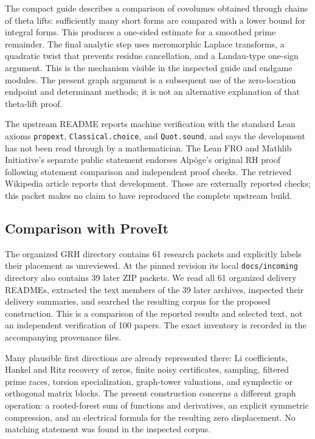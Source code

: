 The compact guide describes a comparison of covolumes obtained through
chains of theta lifts: sufficiently many short forms are compared with a
lower bound for integral forms.  This produces a one-sided estimate for a
smoothed prime remainder.  The final analytic step uses meromorphic
Laplace transforms, a quadratic twist that prevents residue cancellation,
and a Landau-type one-sign argument.  This is the mechanism visible in
the inspected guide and endgame modules.  The present graph argument is a
subsequent use of the zero-location endpoint and determinant methods; it
is not an alternative explanation of that theta-lift proof.\cite{grhguide}

The upstream README reports machine verification with the standard Lean
axioms \texttt{propext}, \texttt{Classical.choice}, and \texttt{Quot.sound},
and says the development has not been read through by a mathematician.
The Lean FRO and Mathlib Initiative's separate public statement endorses
Alp\"oge's original RH proof following statement comparison and independent
proof checks.  The retrieved Wikipedia article reports that development.
Those are externally reported checks; this packet makes no claim to have
reproduced the complete upstream build.\cite{grhsource,leanstatement,wikipedia}

\subsection{Comparison with ProveIt}

The organized GRH directory contains 61 research packets and explicitly
labels their placement as unreviewed.  At the pinned revision its local
\texttt{docs/incoming} directory also contains 39 later ZIP packets.  We
read all 61 organized delivery READMEs, extracted the text members of the
39 later archives, inspected their delivery summaries, and searched the
resulting corpus for the proposed construction.  This is a comparison of
the reported results and selected text, not an independent verification of
100 papers.  The exact inventory is recorded in the accompanying
provenance files.\cite{proveit}

Many plausible first directions are already represented there: Li
coefficients, Hankel and Ritz recovery of zeros, finite noisy certificates,
sampling, filtered prime races, torsion specialization, graph-tower
valuations, and symplectic or orthogonal matrix blocks.  The present
construction concerns a different graph operation: a rooted-forest sum of
functions and derivatives, an explicit symmetric compression, and an
electrical formula for the resulting zero displacement.  No matching
statement was found in the inspected corpus.

